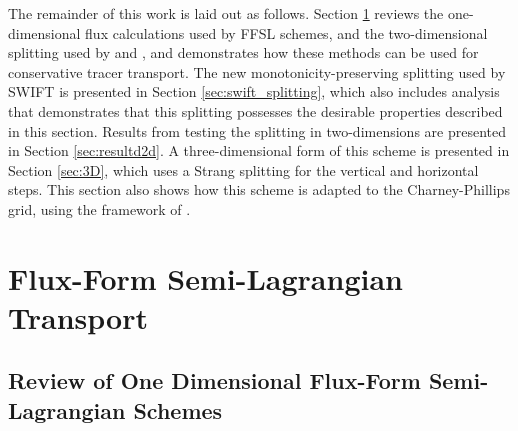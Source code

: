 \documentclass[11pt,a4paper]{article}
\begin{document}
The remainder of this work is laid out as follows.
Section \ref{sec:ffsl} reviews the one-dimensional flux calculations used by FFSL schemes, and the two-dimensional  splitting used by \citet{leonard1996cosmic} and \citet{lin1996ffsl}, and demonstrates how these methods can be used for conservative tracer transport. The new monotonicity-preserving splitting used by SWIFT is presented in Section \ref{sec:swift_splitting}, which also includes analysis that demonstrates that this splitting possesses the desirable properties described in this section.
Results from testing the splitting in two-dimensions are presented in Section \ref{sec:resultd2d}.
A three-dimensional form of this scheme is presented in Section \ref{sec:3D}, which uses a Strang splitting for the vertical and horizontal steps. This section also shows how this scheme is adapted to the Charney-Phillips grid, using the framework of \cite{bendall2023solution}.


\section{Flux-Form Semi-Lagrangian Transport} \label{sec:ffsl}

\subsection{Review of One Dimensional Flux-Form Semi-Lagrangian Schemes} \label{sec:1d_ffsl}
\end{document}
